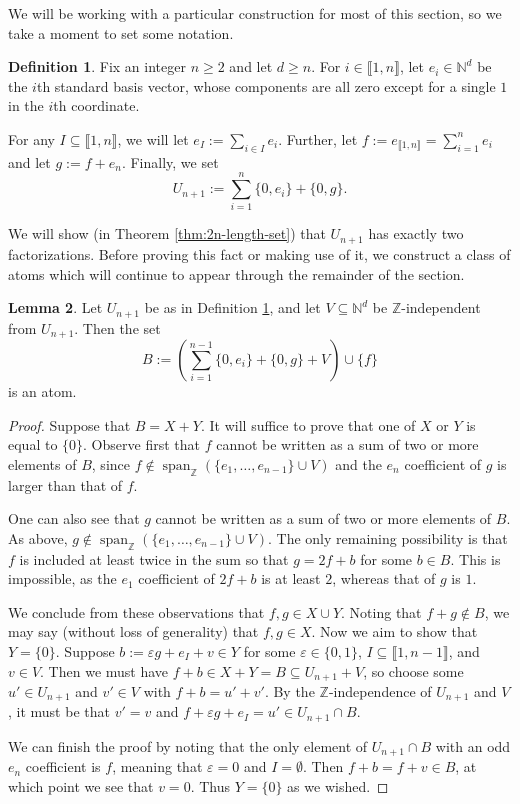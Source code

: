 \documentclass{report}
\newcommand{\NN}{\mathbb{N}}
\newcommand{\ZZ}{\mathbb{Z}}
\newcommand{\llb}{\llbracket}
\newcommand{\rrb}{\rrbracket}
\renewcommand{\:}{\text{:}}
\theoremstyle{definition}
\newtheorem{defn}{Definition}[section]
\newtheorem{lemma}[defn]{Lemma}
\begin{document}
We will be working with a particular construction for most of this section, so we take a moment to set some notation.

\begin{defn} \label{def:two-fac-construction}
Fix an integer $n\ge 2$ and let $d\ge n$.
For $i\in \llb 1,n\rrb$, let $e_i \in \NN^d$ be the $i$th standard basis vector, whose components are all zero except for a single $1$ in the $i$th coordinate.

For any $I \subseteq \llb 1,n \rrb$, we will let $e_I := \sum_{i\in I} e_i$.
Further, let $f := e_{\llb 1,n \rrb} = \sum_{i=1}^n e_i$ and let $g := f + e_n$.
Finally, we set
\[U_{n+1} := \sum_{i=1}^n \{0,e_i\} + \{0,g\}.\]
\end{defn}

We will show (in Theorem \ref{thm:2n-length-set}) that $U_{n+1}$ has exactly two factorizations. 
Before proving this fact or making use of it, we construct a class of atoms which will continue to appear through the remainder of the section.

\begin{lemma} \label{lem:large-atom-two-fac}
Let $U_{n+1}$ be as in Definition \ref{def:two-fac-construction}, and let $V\subseteq \NN^d$ be $\ZZ$-independent from $U_{n+1}$.
Then the set
\[ B:= \left( \sum_{i=1}^{n-1} \{0,e_i\} + \{0,g\} + V \right) \cup \{f\} \]
is an atom.
\end{lemma}

\begin{proof}
Suppose that $B = X + Y$.
It will suffice to prove that one of $X$ or $Y$ is equal to $\{0\}$.
Observe first that $f$ cannot be written as a sum of two or more elements of $B$, since $f\notin \operatorname{span}_\ZZ (\{e_1,\dots, e_{n-1}\}\cup V)$ and the $e_n$ coefficient of $g$ is larger than that of $f$.

One can also see that $g$ cannot be written as a sum of two or more elements of $B$.
As above, $g\notin \operatorname{span}_\ZZ (\{e_1,\dots, e_{n-1}\}\cup V)$.
The only remaining possibility is that $f$ is included at least twice in the sum so that $g = 2f + b$ for some $b\in B$.
This is impossible, as the $e_1$ coefficient of $2f+b$ is at least $2$, whereas that of $g$ is $1$.

We conclude from these observations that $f,g\in X \cup Y$.
Noting that $f+g \notin B$, we may say (without loss of generality) that $f,g\in X$.
Now we aim to show that $Y = \{0\}$.
Suppose $b := \varepsilon g + e_I +v \in Y$ for some $\varepsilon \in \{0,1\}$, $I\subseteq \llb 1,n-1\rrb$, and $v\in V$.
Then we must have $f + b \in X+Y = B \subseteq U_{n+1} + V$, so choose some $u'\in U_{n+1}$ and $v'\in V$ with $f + b = u' + v'$.
By the $\ZZ$-independence of $U_{n+1}$ and $V$, it must be that $v' = v$ and $f + \varepsilon g + e_I = u' \in U_{n+1} \cap B$.

We can finish the proof by noting that the only element of $U_{n+1}\cap B$ with an odd $e_n$ coefficient is $f$, meaning that $\varepsilon=0$ and $I = \emptyset$.
Then $f+b = f+v \in B$, at which point we see that $v = 0$.
Thus $Y = \{0\}$ as we wished.
\end{proof}
\end{document}
